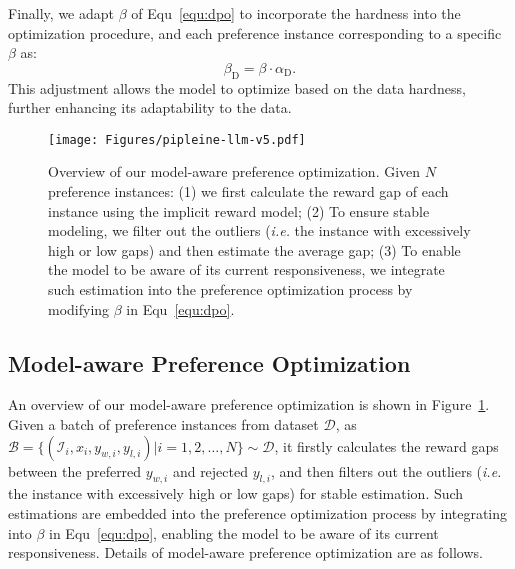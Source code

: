 Finally, we adapt $\beta$ of Equ~\eqref{equ:dpo} to incorporate the hardness into the optimization procedure, and each preference instance corresponding to a specific $\beta$ as:
\begin{equation}
\label{equ:update beta data}
    \beta_{\mathrm{D}} = \beta \cdot \alpha_{\mathrm{D}}.
\end{equation}
This adjustment allows the model to optimize based on the data hardness, further enhancing its adaptability to the data.

\begin{figure}[t]
\vskip 0.2in
\begin{center}
\centerline{\texttt{[image: Figures/pipleine-llm-v5.pdf]}}
\caption{Overview of our model-aware preference optimization. Given $N$ preference instances: (1) we first calculate the reward gap of each instance using the implicit reward model; (2) To ensure stable modeling, we filter out the outliers (\textit{i.e.} the instance with excessively high or low gaps) and then estimate the average gap; (3) To enable the model to be aware of its current responsiveness, we integrate such estimation into the preference optimization process by modifying $\beta$ in Equ~\eqref{equ:dpo}.}
\label{fig:pipleine-llm-v2}
\end{center}
\vskip -0.2in
\end{figure}

\subsection{Model-aware Preference Optimization}
\label{subsec:Model-aware Preference Optimization}
An overview of our model-aware preference optimization is shown in Figure~\ref{fig:pipleine-llm-v2}. 
Given a batch of preference instances from dataset $\mathcal{D}$, as $\mathcal{B} = \{ (\mathcal{I}_{i}, x_{i}, y_{w,i}, y_{l,i}) | i = 1,2,\dots,N \} \sim \mathcal{D}$, 
it firstly calculates the reward gaps between the preferred $y_{w,i}$ and rejected $y_{l,i}$, and then filters out the outliers (\textit{i.e.} the instance with excessively high or low gaps) for stable estimation.
Such estimations are embedded into the preference optimization process by integrating into $\beta$ in Equ~\eqref{equ:dpo}, enabling the model to be aware of its current responsiveness. 
Details of model-aware preference optimization are as follows.

